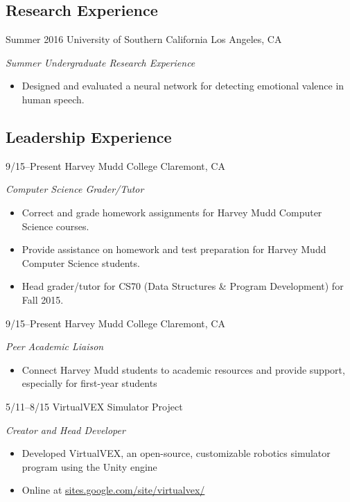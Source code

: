 \documentclass[print]{friggeri-cv} %
\begin{document}
\subsection{Research Experience}

\begin{entrylist}

\entry
{Summer 2016}
{University of Southern California}
{Los Angeles, CA}
{\emph{Summer Undergraduate Research Experience}
\begin{itemize}
\item Designed and evaluated a neural network for detecting emotional valence in human speech.
\end{itemize}}

\end{entrylist}

\subsection{Leadership Experience}

\begin{entrylist}

\entry
{9/15--Present}
{Harvey Mudd College}
{Claremont, CA}
{\emph{Computer Science Grader/Tutor}
\begin{itemize}
\item Correct and grade homework assignments for Harvey Mudd Computer Science courses.
\item Provide assistance on homework and test preparation for Harvey Mudd Computer Science students.
\item Head grader/tutor for CS70 (Data Structures \& Program Development) for Fall 2015.
\end{itemize}}


\entry
{9/15--Present}
{Harvey Mudd College}
{Claremont, CA}
{\emph{Peer Academic Liaison}
\begin{itemize}
\item Connect Harvey Mudd students to academic resources and provide support, especially for first-year students
\end{itemize}}


\entry
{5/11--8/15}
{VirtualVEX Simulator Project}
{}
{\emph{Creator and Head Developer}
\begin{itemize}
\item Developed VirtualVEX, an open-source, customizable robotics simulator program using the Unity engine
\item Online at \href{https://sites.google.com/site/virtualvex/}{sites.google.com/site/virtualvex/}
\end{itemize}}

\end{entrylist}
\end{document}
